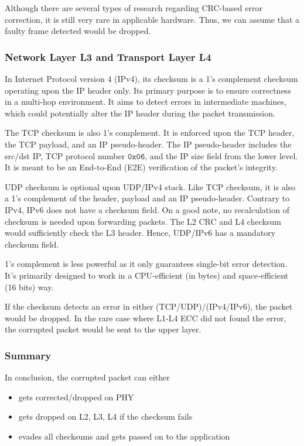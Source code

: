 \documentclass[12pt]{article}
\begin{document}
Although there are several types of research regarding CRC-based error correction, it is still very rare in applicable hardware. Thus, we can assume that a faulty frame detected would be dropped.

\subsubsection{Network Layer L3 and Transport Layer L4}

In Internet Protocol version 4 (IPv4), its checksum is a 1's complement checksum operating upon the IP header only. Its primary purpose is to ensure correctness in a multi-hop environment. It aims to detect errors in intermediate machines, which could potentially alter the IP header during the packet transmission.

The TCP checksum is also 1's complement. It is enforced upon the TCP header, the TCP payload, and an IP pseudo-header. The IP pseudo-header includes the src/dst IP, TCP protocol number $\mathtt{0x06}$, and the IP size field from the lower level. It is meant to be an End-to-End (E2E) verification of the packet's integrity.

UDP checksum is optional upon UDP/IPv4 stack. Like TCP checksum, it is also a 1's complement of the header, payload and an IP pseudo-header. Contrary to IPv4, IPv6 does not have a checksum field. On a good note, no recalculation of checksum is needed upon forwarding packets. The L2 CRC and  L4 checksum would sufficiently check the L3 header. Hence, UDP/IPv6 has a mandatory checksum field.

1's complement is less powerful as it only guarantees single-bit error detection. It's primarily designed to work in a CPU-efficient (in bytes) and space-efficient (16 bits) way.

If the checksum detects an error in either (TCP/UDP)/(IPv4/IPv6), the packet would be dropped. In the rare case where L1-L4 ECC did not found the error, the corrupted packet would be sent to the upper layer.

\subsubsection{Summary}

In conclusion, the corrupted packet can either
\begin{itemize}
  \item gets corrected/dropped on PHY
  \item gets dropped on L2, L3, L4 if the checksum fails
  \item evades all checksums and gets passed on to the application
\end{itemize}
\end{document}
